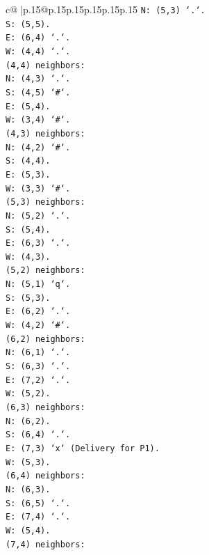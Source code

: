 \documentclass{article}
\begin{document}
{\begin{supertabular}{c@{$\;$}|p{.15\linewidth}@{}p{.15\linewidth}p{.15\linewidth}p{.15\linewidth}p{.15\linewidth}p{.15\linewidth}}
{{{\texttt{N: (5,3) `.`.} \\
\texttt{S: (5,5).} \\
\texttt{E: (6,4) `.`.} \\
\texttt{W: (4,4) `.`.} \\
\texttt{(4,4) neighbors:} \\
\texttt{N: (4,3) `.`.} \\
\texttt{S: (4,5) `\#`.} \\
\texttt{E: (5,4).} \\
\texttt{W: (3,4) `\#`.} \\
\texttt{(4,3) neighbors:} \\
\texttt{N: (4,2) `\#`.} \\
\texttt{S: (4,4).} \\
\texttt{E: (5,3).} \\
\texttt{W: (3,3) `\#`.} \\
\texttt{(5,3) neighbors:} \\
\texttt{N: (5,2) `.`.} \\
\texttt{S: (5,4).} \\
\texttt{E: (6,3) `.`.} \\
\texttt{W: (4,3).} \\
\texttt{(5,2) neighbors:} \\
\texttt{N: (5,1) `q`.} \\
\texttt{S: (5,3).} \\
\texttt{E: (6,2) `.`.} \\
\texttt{W: (4,2) `\#`.} \\
\texttt{(6,2) neighbors:} \\
\texttt{N: (6,1) `.`.} \\
\texttt{S: (6,3) `.`.} \\
\texttt{E: (7,2) `.`.} \\
\texttt{W: (5,2).} \\
\texttt{(6,3) neighbors:} \\
\texttt{N: (6,2).} \\
\texttt{S: (6,4) `.`.} \\
\texttt{E: (7,3) `x` (Delivery for P1).} \\
\texttt{W: (5,3).} \\
\texttt{(6,4) neighbors:} \\
\texttt{N: (6,3).} \\
\texttt{S: (6,5) `.`.} \\
\texttt{E: (7,4) `.`.} \\
\texttt{W: (5,4).} \\
\texttt{(7,4) neighbors:} \\
}}}
\end{supertabular}}
\end{document}
